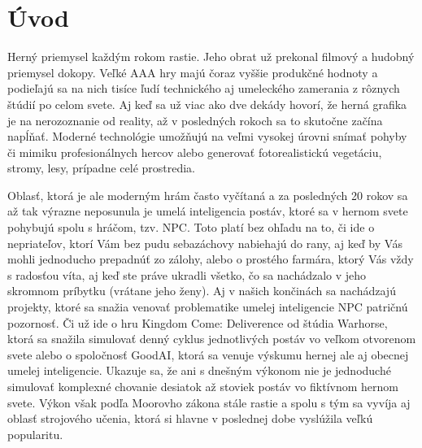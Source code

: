 \documentclass[slovak, master]{diploma}
\begin{document}
\MakeTitlePages

\listoffigures
\clearpage

\listoftables
\clearpage

\lstlistoflistings
\clearpage

\chapter{Úvod}
\label{sec:Introduction}
Herný priemysel každým rokom rastie. Jeho obrat už prekonal filmový a hudobný priemysel dokopy. Veľké AAA hry majú čoraz vyššie produkčné hodnoty a podieľajú sa na nich tisíce ľudí technického aj umeleckého zamerania z rôznych štúdií po celom svete. Aj keď sa už viac ako dve dekády hovorí, že herná grafika je na nerozoznanie od reality, až v posledných rokoch sa to skutočne začína napĺňať. Moderné technológie umožňujú na veľmi vysokej úrovni snímať pohyby či mimiku profesionálnych hercov alebo generovať fotorealistickú vegetáciu, stromy, lesy, prípadne celé prostredia. 

Oblasť, ktorá je ale moderným hrám často vyčítaná a za posledných 20 rokov sa až tak výrazne neposunula je umelá inteligencia postáv, ktoré sa v hernom svete pohybujú spolu s hráčom, tzv. NPC. Toto platí bez ohľadu na to, či ide o nepriateľov, ktorí Vám bez pudu sebazáchovy nabiehajú do rany, aj keď by Vás mohli jednoducho prepadnúť zo zálohy, alebo o prostého farmára, ktorý Vás vždy s radosťou víta, aj keď ste práve ukradli všetko, čo sa nachádzalo v jeho skromnom príbytku (vrátane jeho ženy). Aj v našich končinách sa nachádzajú projekty, ktoré sa snažia venovať problematike umelej inteligencie NPC patričnú pozornosť. Či už ide o hru Kingdom Come: Deliverence od štúdia Warhorse, ktorá sa snažila simulovať denný cyklus jednotlivých postáv vo veľkom otvorenom svete alebo o spoločnosť GoodAI, ktorá sa venuje výskumu hernej ale aj obecnej umelej inteligencie. Ukazuje sa, že ani s dnešným výkonom nie je jednoduché simulovať komplexné chovanie desiatok až stoviek postáv vo fiktívnom hernom svete. Výkon však podľa Moorovho zákona stále rastie a spolu s tým sa vyvíja aj oblasť strojového učenia, ktorá si hlavne v poslednej dobe vyslúžila veľkú popularitu.
\end{document}
